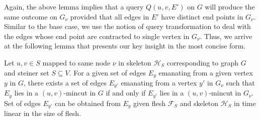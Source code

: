 Again, the above lemma implies that a query $Q(u,v,E')$ on $G$ will produce the same outcome on $G_\nu$ provided that all edges in $E'$ have distinct end points in $G_\nu$. Similar to the base case, we use the notion of query transformation to deal with the  edges whose end point are contracted to single vertex in $G_\nu$. Thus, we arrive at the following lemma that presents our key insight in the most concise form.

\begin{lemma} \label{lem:edge-correspondence}
Let $u,v \in S$ mapped to same node $\nu$ in skeleton $\mathcal H_S$ corresponding to graph $G$ and steiner set $S\subseteq V$. For a given set of edges $E_y$ emanating from a given vertex $y$ in $G$, there exists a set of edges $E_{y'}$ emanating from a vertex $y'$ in $G_\nu$ such that $E_y$ lies in a $(u,v)$-mincut in $G$ if and only if $E_{y'}$ lies in a $(u,v)$-mincut in $G_\nu$. Set of edges $E_{y'}$ can be obtained from $E_y$ given flesh $\mathcal F_S$ and skeleton $\mathcal H_S$ in time linear in the size of flesh.
\end{lemma}

